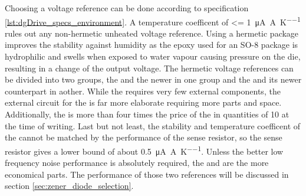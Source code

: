 Choosing a voltage reference can be done according to specification \ref{lst:dgDrive_specs_environment}. A temperature coefficent of \qty{<= 1}{\uA \per \A \per \K} rules out any non-hermetic unheated voltage reference. Using a hermetic package improves the stability against humidity as the epoxy used for an SO-8 package is hydrophilic and swells when exposed to water vapour causing pressure on the die, resulting in a change of the output voltage. The hermetic voltage references can be divided into two groups, the  and the newer  in one group and the  and its newer counterpart  in aother. While the  requires very few external components, the external circuit for the  is far more elaborate requiring more parts and space. Additionally, the  is more than four times the price of the  in quantities of \num{10} at the time of writing. Last but not least, the stability and temperature coefficent of the  cannot be matched by the performance of the sense resistor, so the sense resistor gives a lower bound of about \qty{0.5}{\uA \per \A \per \K}. Unless the better low frequency noise performance is absolutely required, the  and  are the more economical parts. The performance of those two references will be discussed in section \ref{sec:zener_diode_selection}.

